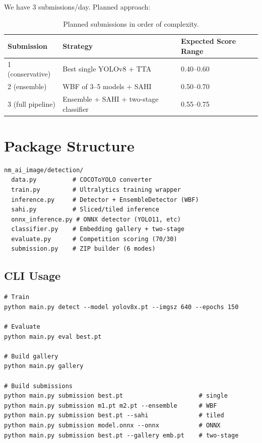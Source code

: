 \documentclass[11pt,a4paper]{article}
\begin{document}
We have 3 submissions/day. Planned approach:

\begin{table}[h]
\centering
\begin{tabular}{@{}lll@{}}
\toprule
\textbf{Submission} & \textbf{Strategy} & \textbf{Expected Score Range} \\
\midrule
1 (conservative) & Best single YOLOv8 + TTA & 0.40--0.60 \\
2 (ensemble) & WBF of 3--5 models + SAHI & 0.50--0.70 \\
3 (full pipeline) & Ensemble + SAHI + two-stage classifier & 0.55--0.75 \\
\bottomrule
\end{tabular}
\caption{Planned submissions in order of complexity.}
\end{table}

\section{Package Structure}

\begin{lstlisting}
nm_ai_image/detection/
  data.py          # COCOToYOLO converter
  train.py         # Ultralytics training wrapper
  inference.py     # Detector + EnsembleDetector (WBF)
  sahi.py          # Sliced/tiled inference
  onnx_inference.py # ONNX detector (YOLO11, etc)
  classifier.py    # Embedding gallery + two-stage
  evaluate.py      # Competition scoring (70/30)
  submission.py    # ZIP builder (6 modes)
\end{lstlisting}

\subsection{CLI Usage}
\begin{lstlisting}
# Train
python main.py detect --model yolov8x.pt --imgsz 640 --epochs 150

# Evaluate
python main.py eval best.pt

# Build gallery
python main.py gallery

# Build submissions
python main.py submission best.pt                     # single
python main.py submission m1.pt m2.pt --ensemble      # WBF
python main.py submission best.pt --sahi              # tiled
python main.py submission model.onnx --onnx           # ONNX
python main.py submission best.pt --gallery emb.pt    # two-stage
\end{lstlisting}
\end{document}
